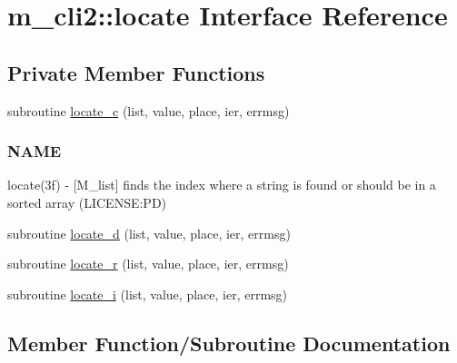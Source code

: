 \hypertarget{interfacem__cli2_1_1locate}{}\section{m\+\_\+cli2\+:\+:locate Interface Reference}
\label{interfacem__cli2_1_1locate}
\subsection*{Private Member Functions}
\begin{DoxyCompactItemize}
\item 
subroutine \mbox{\hyperlink{interfacem__cli2_1_1locate_a59a1546b8eab776a0ba5594b6b90ae72}{locate\+\_\+c}} (list, value, place, ier, errmsg)
\begin{DoxyCompactList}\small\item\em \subsubsection*{N\+A\+ME}

locate(3f) -\/ \mbox{[}M\+\_\+list\mbox{]} finds the index where a string is found or should be in a sorted array (L\+I\+C\+E\+N\+SE\+:PD) \end{DoxyCompactList}\item 
subroutine \mbox{\hyperlink{interfacem__cli2_1_1locate_ac8d6a83fb2617b1a370d6f4142cfbf6b}{locate\+\_\+d}} (list, value, place, ier, errmsg)
\item 
subroutine \mbox{\hyperlink{interfacem__cli2_1_1locate_a93368b61603fe74c498b1190a502c271}{locate\+\_\+r}} (list, value, place, ier, errmsg)
\item 
subroutine \mbox{\hyperlink{interfacem__cli2_1_1locate_a4bc5036ad18af931624efb52459bdef3}{locate\+\_\+i}} (list, value, place, ier, errmsg)
\end{DoxyCompactItemize}


\subsection{Member Function/\+Subroutine Documentation}
\mbox{\label{interfacem__cli2_1_1locate_a59a1546b8eab776a0ba5594b6b90ae72}} 
